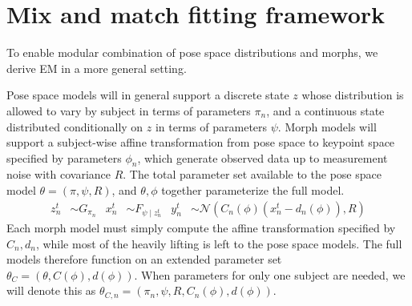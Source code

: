 \documentclass{article}         %
\newcommand{\NN}{\mathcal{N}}
\begin{document}
\section{Mix and match fitting framework}

To enable modular combination of pose space distributions and morphs, we derive EM in a more general setting.

Pose space models will in general support a discrete state $z$ whose distribution is allowed to vary by subject in terms of parameters $\pi_n$, and a continuous state distributed conditionally on $z$ in terms of parameters $\psi$. Morph models will support a subject-wise affine transformation from pose space to keypoint space specified by parameters $\phi_n$, which generate observed data up to measurement noise with covariance $R$. The total parameter set available to the pose space model $\theta = (\pi, \psi, R)$, and $\theta, \phi$ together parameterize the full model.
\begin{align}
    z^t_n &\sim G_{\pi_n} &
    x^t_n &\sim F_{\psi \mid z^t_n} &
    y^t_n &\sim \NN(C_n(\phi) (x_n^t - d_n(\phi)), R)
\end{align}
Each morph model must simply compute the affine transformation specified by $C_n, d_n$, while most of the heavily lifting is left to the pose space models.
The full models therefore function on an extended parameter set $\theta_C = (\theta, C(\phi), d(\phi))$. When parameters for only one subject are needed, we will
denote this as $\theta_{C,n} = (\pi_n, \psi, R, C_n(\phi), d(\phi))$.
\end{document}
